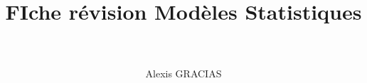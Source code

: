 \documentclass[12pt,french]{report}
\title{
    \HRule \\[0.4cm] \Huge \bfseries 
    FIche révision Modèles Statistiques
    \\[0.15cm] \HRule \\[0.4cm]}
\author{\Large Alexis GRACIAS}
\begin{document}
\maketitle

\dominitoc %
\large \tableofcontents
\normalsize %

\renewcommand{\chaptermark}[1]{ \markboth{#1}{} }
\pagestyle{fancy}
\fancyhead{} %
\fancyhead[RO,LE]{\leftmark}
\fancyfoot{} %

\makeatletter
\renewcommand{\@evenfoot}{\makebox[\textwidth][c]{page {\thepage} sur \pageref{LastPage}}}
\renewcommand{\@oddfoot}{\@evenfoot}
\makeatother

\renewcommand{\labelitemi}{$\bullet$}
\renewcommand{\labelitemii}{---}
\renewcommand{\labelitemiii}{-}
\renewcommand{\labelitemiv}{.}



\end{document}
